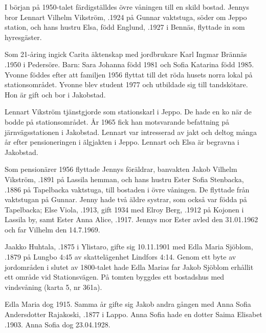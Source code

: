 I början på 1950-talet färdigställdes övre våningen till en skild bostad.	Jennys bror Lennart Vilhelm Vikström, .1924 på Gunnar vaktstuga, söder om Jeppo station, och hans hustru Elsa, född Englund, .1927 i Bennäs, flyttade in som hyresgäster.
\begin{jhchildren}
  \item {}
  \item {}
\end{jhchildren}
Som 21-åring ingick Carita äktenskap med	jordbrukare Karl Ingmar Brännäs .1950 i Pedersöre. Barn: Sara Johanna född 1981 och Sofia Katarina född 1985. Yvonne föddes efter att familjen 1956 flyttat till det röda husets norra lokal på stationsområdet. Yvonne blev student 1977 och utbildade sig till tandskötare. Hon är gift och bor i	Jakobstad.

Lennart Vikström tjänstgjorde som stationskarl i Jeppo. De hade en ko	när de bodde på stationsområdet. År 1965 fick han motsvarande	befattning på järnvägsstationen i Jakobstad. Lennart var intresserad av	jakt och deltog många år efter pensioneringen i älgjakten i Jeppo. Lennart och Elsa är begravna i Jakobstad.

Som pensionärer 1956 flyttade Jennys föräldrar, banvakten Jakob	Vilhelm Vikström, .1891 på Lassila hemman, och	hans hustru Ester Sofia Stenbacka, .1886 på Tapelbacka	vaktstuga, till bostaden i övre våningen. De flyttade från vaktstugan på Gunnar. Jenny hade två äldre systrar, som också var födda på Tapelbacka; Else Viola, .1913, gift 1934 med Elroy Berg, .1912 på Kojonen i Lassila by, samt Ester Anna Alice, .1917. Jennys mor Ester avled den 31.01.1962 och far Vilhelm den 14.7.1969.


Jaakko Huhtala, .1875 i Ylistaro, gifte sig 10.11.1901 med Edla Maria Sjöblom, .1879 på Lungbo 4:45 av skattelägenhet Lindfors 4:14. Genom ett byte av jordområden i slutet av 1800-talet hade Edla Marias far Jakob Sjöblom erhållit ett område vid Stationsvägen. På tomten byggdes ett bostadshus med vindsvåning (karta 5, nr 361a).
\begin{jhchildren}
  \item {}
  \item {}
  \item {}
  \item {}
  \item {}
\end{jhchildren}
Edla Maria dog 1915. Samma år gifte sig Jakob andra gången med Anna Sofia Andersdotter Rajakoski, .1877 i Lappo. Anna Sofia hade en dotter Saima Elisabet .1903. Anna Sofia dog 23.04.1928.


